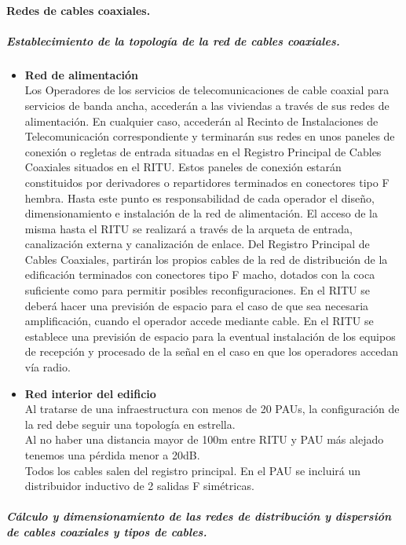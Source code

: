 \paragraph{Redes de cables coaxiales.}
\subparagraph{Establecimiento de la topología de la red de cables coaxiales.}
\begin{itemize}
	\item \textbf{Red de alimentación}\\
	Los Operadores de los servicios de telecomunicaciones de cable coaxial para servicios de banda
ancha, accederán a las viviendas a través de sus redes de alimentación. En cualquier caso, accederán
al Recinto de Instalaciones de Telecomunicación correspondiente y terminarán sus redes en unos
paneles de conexión o regletas de entrada situadas en el Registro Principal de Cables Coaxiales
situados en el RITU. Estos paneles de conexión estarán constituidos por derivadores o
repartidores terminados en conectores tipo F hembra.
Hasta este punto es responsabilidad de cada operador el diseño, dimensionamiento e instalación
de la red de alimentación. El acceso de la misma hasta el RITU se realizará a través de la arqueta
de entrada, canalización externa y canalización de enlace.
Del Registro Principal de Cables Coaxiales, partirán los propios cables de la red de distribución
de la edificación terminados con conectores tipo F macho, dotados con la coca suficiente como
para permitir posibles reconfiguraciones.
En el RITU se deberá hacer una previsión de espacio para el caso de que sea necesaria
amplificación, cuando el operador accede mediante cable.
En el RITU se establece una previsión de espacio para la eventual instalación de los equipos de
recepción y procesado de la señal en el caso en que los operadores accedan vía radio.
\end{itemize}
\begin{itemize}
	\item \textbf{Red interior del edificio}\\
Al tratarse de una infraestructura con menos de 20 PAUs, la configuración de la red debe seguir una topología en estrella.\\
Al no haber una distancia mayor de 100m entre RITU y PAU más alejado tenemos una pérdida menor a 20dB.\\
Todos los cables salen del registro principal.
En el PAU se incluirá un distribuidor inductivo de 2 salidas F simétricas.
\end{itemize}
\subparagraph{Cálculo y dimensionamiento de las redes de distribución y dispersión de cables coaxiales y tipos de cables.}

